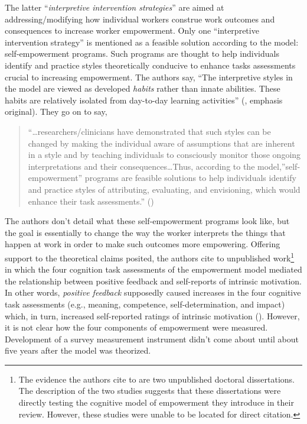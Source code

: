 \documentclass[
  11pt,
  a4paper,
]{article}
\begin{document}
The latter ``\emph{interpretive intervention strategies}'' are aimed at
addressing/modifying how individual workers construe work outcomes and
consequences to increase worker empowerment. Only one ``interpretive
intervention strategy'' is mentioned as a feasible solution according to
the model: self-empowerment programs. Such programs are thought to help
individuals identify and practice styles theoretically conducive to
enhance tasks assessments crucial to increasing empowerment. The authors
say, ``The interpretive styles in the model are viewed as developed
\emph{habits} rather than innate abilities. These habits are relatively
isolated from day-to-day learning activities''
(, emphasis
original). They go on to say,

\begin{quote}
``\ldots researchers/clinicians have demonstrated that such styles can
be changed by making the individual aware of assumptions that are
inherent in a style and by teaching individuals to consciously monitor
those ongoing interpretations and their consequences\ldots Thus,
according to the model,''self-empowerment'' programs are feasible
solutions to help individuals identify and practice styles of
attributing, evaluating, and envisioning, which would enhance their task
assessments.'' ()
\end{quote}

The authors don't detail what these self-empowerment programs look like,
but the goal is essentially to change the way the worker interprets the
things that happen at work in order to make such outcomes more
empowering. Offering support to the theoretical claims posited, the
authors cite to unpublished work\footnote{The evidence the authors cite
  to are two unpublished doctoral dissertations. The description of the
  two studies suggests that these dissertations were directly testing
  the cognitive model of empowerment they introduce in their review.
  However, these studies were unable to be located for direct citation.}
in which the four cognition task assessments of the empowerment model
mediated the relationship between positive feedback and self-reports of
intrinsic motivation. In other words, \emph{positive feedback}
supposedly caused increases in the four cognitive task assessments
(e.g., meaning, competence, self-determination, and impact) which, in
turn, increased self-reported ratings of intrinsic motivation
(). However, it
is not clear how the four components of empowerment were measured.
Development of a survey measurement instrument didn't come about until
about five years after the model was theorized.
\end{document}
